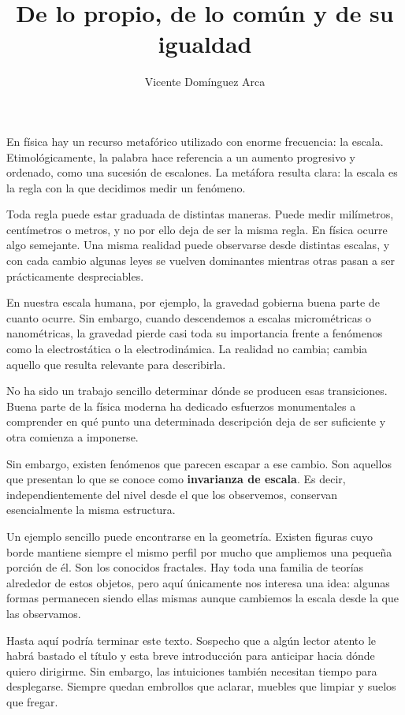 \documentclass[11pt,a4paper]{article}
\title{\textbf{De lo propio, de lo común y de su igualdad}}
\author{Vicente Domínguez Arca}
\date{}
\begin{document}
\maketitle

En física hay un recurso metafórico utilizado con enorme frecuencia: la escala. Etimológicamente, la palabra hace referencia a un aumento progresivo y ordenado, como una sucesión de escalones. La metáfora resulta clara: la escala es la regla con la que decidimos medir un fenómeno.

Toda regla puede estar graduada de distintas maneras. Puede medir milímetros, centímetros o metros, y no por ello deja de ser la misma regla. En física ocurre algo semejante. Una misma realidad puede observarse desde distintas escalas, y con cada cambio algunas leyes se vuelven dominantes mientras otras pasan a ser prácticamente despreciables.

En nuestra escala humana, por ejemplo, la gravedad gobierna buena parte de cuanto ocurre. Sin embargo, cuando descendemos a escalas micrométricas o nanométricas, la gravedad pierde casi toda su importancia frente a fenómenos como la electrostática o la electrodinámica. La realidad no cambia; cambia aquello que resulta relevante para describirla.

No ha sido un trabajo sencillo determinar dónde se producen esas transiciones. Buena parte de la física moderna ha dedicado esfuerzos monumentales a comprender en qué punto una determinada descripción deja de ser suficiente y otra comienza a imponerse.

Sin embargo, existen fenómenos que parecen escapar a ese cambio. Son aquellos que presentan lo que se conoce como \textbf{invarianza de escala}. Es decir, independientemente del nivel desde el que los observemos, conservan esencialmente la misma estructura.

Un ejemplo sencillo puede encontrarse en la geometría. Existen figuras cuyo borde mantiene siempre el mismo perfil por mucho que ampliemos una pequeña porción de él. Son los conocidos fractales. Hay toda una familia de teorías alrededor de estos objetos, pero aquí únicamente nos interesa una idea: algunas formas permanecen siendo ellas mismas aunque cambiemos la escala desde la que las observamos.

Hasta aquí podría terminar este texto. Sospecho que a algún lector atento le habrá bastado el título y esta breve introducción para anticipar hacia dónde quiero dirigirme. Sin embargo, las intuiciones también necesitan tiempo para desplegarse. Siempre quedan embrollos que aclarar, muebles que limpiar y suelos que fregar.
\end{document}
